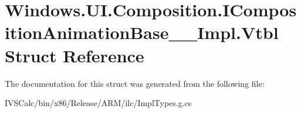 \hypertarget{struct_windows_1_1_u_i_1_1_composition_1_1_i_composition_animation_base_____impl_1_1_vtbl}{}\section{Windows.\+U\+I.\+Composition.\+I\+Composition\+Animation\+Base\+\_\+\+\_\+\+Impl.\+Vtbl Struct Reference}
\label{struct_windows_1_1_u_i_1_1_composition_1_1_i_composition_animation_base_____impl_1_1_vtbl}


The documentation for this struct was generated from the following file\+:\begin{DoxyCompactItemize}
\item 
I\+V\+S\+Calc/bin/x86/\+Release/\+A\+R\+M/ilc/Impl\+Types.\+g.\+cs\end{DoxyCompactItemize}
